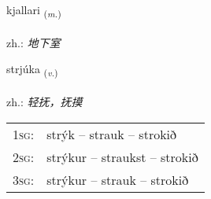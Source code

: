 \documentclass[frontgrid, backgrid]{flacards}\usepackage[]{graphicx}\usepackage[]{xcolor}
\begin{document}
\renewcommand{\blhead}{\vskip5pt {\small\bfseries\footnotesize Nafnorð | 名词 }}
\renewcommand{\bcfoot}{\vskip5pt \hspace{2pt}{\small\bfseries\footnotesize 3K}}


{kjallari \small{\textsubscript{(\textit{m.})}} \\[1ex] %
\textphonetic{[cʰatlarɪ]} \\
zh.: \emph{地下室} \\  [2ex]
\renewcommand*{\arraystretch}{0.8}
}

\renewcommand{\flhead}{\vskip5pt \fboxsep=0pt {\small\bfseries\footnotesize Sagnorð | 动词}}
\renewcommand{\fcfoot}{\vskip5pt \fboxsep=0pt \hspace{2pt}{\small\bfseries\footnotesize 3K}}

\renewcommand{\blhead}{\vskip5pt {\small\bfseries\footnotesize Sagnorð | 动词 }}
\renewcommand{\bcfoot}{\vskip5pt \hspace{2pt}{\small\bfseries\footnotesize 3K}}


{strjúka \small{\textsubscript{(\textit{v.})}} \\[1ex] %
\textphonetic{[strjuːka]} \\
zh.: \emph{轻抚，抚摸} \\  [2ex]
\renewcommand*{\arraystretch}{0.8}
\begin{tabular}{p{1cm}l}
\textsc{1sg}: & strýk -- strauk -- strokið \\ 
\textsc{2sg}: & strýkur -- straukst -- strokið \\ 
\textsc{3sg}: & strýkur -- strauk -- strokið \\ 
\end{tabular}
}
\end{document}
